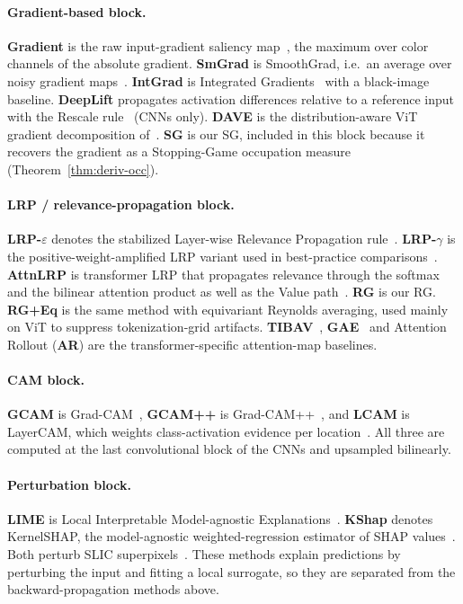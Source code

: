 \documentclass[twoside]{article}
\newif\ifch \chfalse
\newcommand{\ch}[1]{\ifch\textcolor{magenta}{#1}\else#1\fi}
\newcommand{\1}{\mathbf{1}}
\begin{document}
\paragraph{Gradient-based block.}
\textbf{Gradient} is the raw input-gradient saliency map~\citep{simonyan2014deep}, the maximum over
color channels of the absolute gradient. \textbf{SmGrad} is SmoothGrad, i.e.\ an average over noisy
gradient maps~\citep{Smilkov2017}. \textbf{IntGrad} is Integrated
Gradients~\citep{sundararajan2017axiomatic} with a black-image baseline. \textbf{DeepLift}
propagates activation differences relative to a reference input with the Rescale
rule~\citep{Shrikumar2017} (CNNs only). \textbf{DAVE} is the distribution-aware ViT gradient
decomposition of~\citet{Wrobel2024}. \textbf{SG} is our \ac{SG}, included in this block because it
recovers the gradient as a Stopping-Game occupation measure (Theorem~\ref{thm:deriv-occ}).

\paragraph{LRP / relevance-propagation block.}
\textbf{LRP-$\varepsilon$} denotes the stabilized Layer-wise Relevance Propagation
rule~\citep{Bach2015}. \textbf{LRP-$\gamma$} is the positive-weight-amplified LRP variant used in
best-practice comparisons~\citep{Kohlbrenner2020}. \textbf{AttnLRP} is transformer LRP \ch{that
propagates relevance through the softmax and the bilinear attention product as well as the Value
path}~\citep{achtibat2024attnlrp}. \textbf{RG} is our \ac{RG}.
\textbf{RG+Eq} is the same method with equivariant Reynolds averaging, used mainly on ViT to
suppress tokenization-grid artifacts. \textbf{TIBAV}~\citep{Chefer2021transformer},
\textbf{GAE}~\citep{Chefer2021genatt} and Attention Rollout (\textbf{AR}) are the
transformer-specific attention-map baselines.

\paragraph{CAM block.}
\textbf{GCAM} is Grad-CAM~\citep{Selvaraju2017gradcam}, \textbf{GCAM++} is
Grad-CAM++~\citep{Chattopadhyay2018gradcampp}, and \textbf{LCAM} is LayerCAM, which weights
class-activation evidence per location~\citep{Jiang2021layercam}. All three are computed at the
last convolutional block of the CNNs and upsampled bilinearly.

\paragraph{Perturbation block.}
\textbf{LIME} is Local Interpretable Model-agnostic Explanations~\citep{Ribeiro2016lime}.
\textbf{KShap} denotes KernelSHAP, the model-agnostic weighted-regression estimator of SHAP
values~\citep{Lundberg2017}. Both perturb SLIC superpixels~\citep{Achanta2012slic}. These methods
explain predictions by perturbing the input and fitting a local surrogate, so they are separated
from the backward-propagation methods above.
\end{document}
